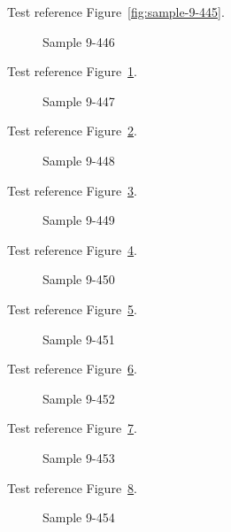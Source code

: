 Test reference Figure~\ref{fig:sample-9-445}.

\begin{figure}[tbhp]
\caption{Sample 9-446}
\label{fig:sample-9-446}
\end{figure}

Test reference Figure~\ref{fig:sample-9-446}.

\begin{figure}[tbhp]
\caption{Sample 9-447}
\label{fig:sample-9-447}
\end{figure}

Test reference Figure~\ref{fig:sample-9-447}.

\begin{figure}[tbhp]
\caption{Sample 9-448}
\label{fig:sample-9-448}
\end{figure}

Test reference Figure~\ref{fig:sample-9-448}.

\begin{figure}[tbhp]
\caption{Sample 9-449}
\label{fig:sample-9-449}
\end{figure}

Test reference Figure~\ref{fig:sample-9-449}.

\begin{figure}[tbhp]
\caption{Sample 9-450}
\label{fig:sample-9-450}
\end{figure}

Test reference Figure~\ref{fig:sample-9-450}.

\begin{figure}[tbhp]
\caption{Sample 9-451}
\label{fig:sample-9-451}
\end{figure}

Test reference Figure~\ref{fig:sample-9-451}.

\begin{figure}[tbhp]
\caption{Sample 9-452}
\label{fig:sample-9-452}
\end{figure}

Test reference Figure~\ref{fig:sample-9-452}.

\begin{figure}[tbhp]
\caption{Sample 9-453}
\label{fig:sample-9-453}
\end{figure}

Test reference Figure~\ref{fig:sample-9-453}.

\begin{figure}[tbhp]
\caption{Sample 9-454}
\label{fig:sample-9-454}
\end{figure}

